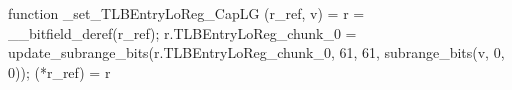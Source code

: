 function _set_TLBEntryLoReg_CapLG (r_ref, v) = {
    r = __bitfield_deref(r_ref);
    r.TLBEntryLoReg_chunk_0 = update_subrange_bits(r.TLBEntryLoReg_chunk_0, 61, 61, subrange_bits(v, 0, 0));
    (*r_ref) = r
}
